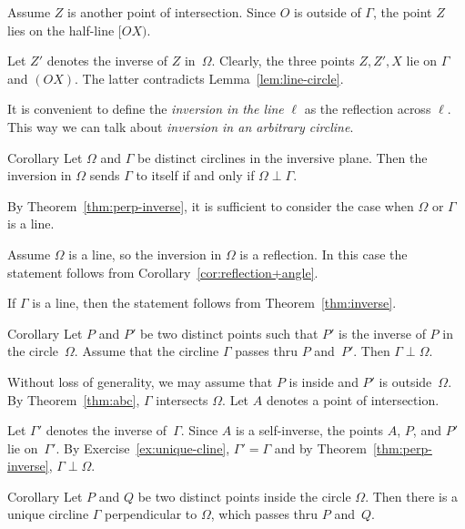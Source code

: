 Assume $Z$ is another point of intersection.
Since $O$ is outside of $\Gamma$, 
the point $Z$ lies on the half-line $[OX)$.

Let $Z'$ denotes the inverse of $Z$ in~$\Omega$.
Clearly, the three points $Z, Z', X$ lie on $\Gamma$ and $(OX)$.
The latter  contradicts Lemma~\ref{lem:line-circle}.
\qeds 

It is convenient to define the 
\emph{inversion in the line} $\ell$
as the reflection across $\ell$.
This way we can talk about \emph{inversion in an arbitrary circline}.

\begin{thm}{Corollary}\label{cor:perp-inverse-clines}
Let $\Omega$  and $\Gamma$ be distinct circlines in the inversive plane.
Then
the inversion in $\Omega$ sends $\Gamma$ to itself if and only if $\Omega\perp\Gamma$.
\end{thm}

By Theorem~\ref{thm:perp-inverse}, it is sufficient to consider the case when $\Omega$ or $\Gamma$ is a line.

Assume $\Omega$ is a line, so the inversion in $\Omega$ is a reflection.
In this case the statement follows from Corollary~\ref{cor:reflection+angle}.

If $\Gamma$ is a line, 
then the statement follows from Theorem~\ref{thm:inverse}.
\qeds

\begin{thm}{Corollary}\label{cor:perp-inverse}
Let $P$ and $P'$ be two distinct points
such that $P'$ is the inverse of $P$ in the circle~$\Omega$.
Assume that the circline $\Gamma$ passes thru $P$ and~$P'$.
Then $\Gamma\perp\Omega$.
\end{thm}

Without loss of generality, we may assume that $P$ is inside and $P'$ is outside~$\Omega$.
By Theorem~\ref{thm:abc}, $\Gamma$ intersects $\Omega$.
Let $A$ denotes a point of intersection.

Let $\Gamma'$ denotes the inverse of~$\Gamma$.
Since $A$ is a self-inverse, the points $A$, $P$, and $P'$ lie on~$\Gamma'$.
By Exercise~\ref{ex:unique-cline},
$\Gamma'=\Gamma$
and by Theorem~\ref{thm:perp-inverse}, $\Gamma\perp\Omega$.
\qeds

\begin{thm}{Corollary}\label{cor:h-line} 
Let $P$ and $Q$ be two distinct points inside the circle $\Omega$.
Then there is a unique circline $\Gamma$ perpendicular to $\Omega$, which passes thru $P$ and~$Q$.  
\end{thm}

